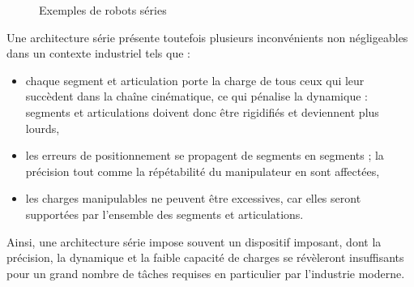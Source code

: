 \begin{figure}[!ht]
  \centering
       \hfill
    \caption{\footnotesize{Exemples de robots séries}}
\label{intro:fig2}
\end{figure}

Une architecture série présente toutefois plusieurs inconvénients non négli\-gea\-bles dans un contexte industriel tels que :
\begin{itemize}
 \item chaque segment et articulation porte la charge de tous ceux qui leur succèdent dans la chaîne cinématique, ce qui pénalise la dynamique : segments et articulations doivent donc être rigidifiés et deviennent plus lourds, 
 \item les erreurs de positionnement se propagent de segments en segments ; la précision tout comme la répétabilité du manipulateur en sont affectées,
 \item les charges manipulables ne peuvent être excessives, car elles seront supportées par l'ensemble des segments et articulations.
\end{itemize}

Ainsi, une architecture série impose souvent un dispositif imposant, dont la précision, la dynamique et la faible capacité de charges se révèleront insuffisants pour un grand nombre de tâches requises en particulier par l'industrie moderne.

